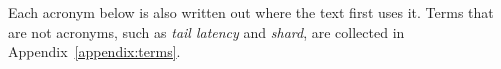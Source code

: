\documentclass[english,oneside,a4paper,censored,csm,software-track-2020]{HYthesisML}
\begin{document}
\cleardoublepage
{}
\setcounter{page}{1}
\tableofcontents

\cleardoublepage
{}
{}
\listoffigures

\cleardoublepage
{}
{}
\listoftables

\cleardoublepage
{}
{}
\chapter*{\nomname}
\markboth{\nomname}{\nomname}
\label{page:acronyms}

\noindent Each acronym below is also written out where the text first uses it. Terms that are
not acronyms, such as \emph{tail latency} and \emph{shard}, are collected in
Appendix~\ref{appendix:terms}.
\end{document}
